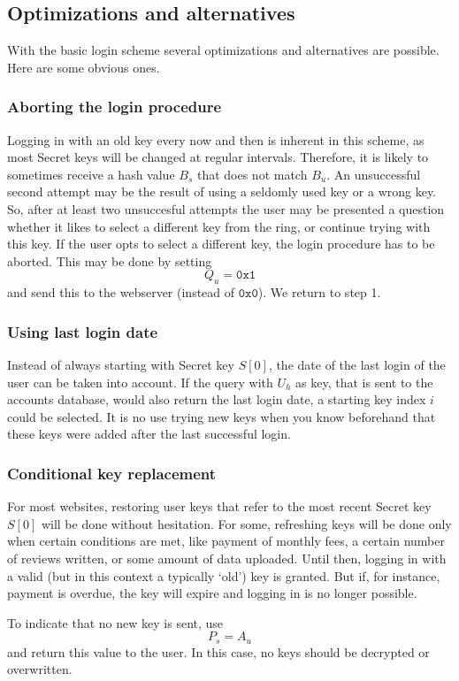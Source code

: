 \subsection{Optimizations and alternatives}
With the basic login scheme several optimizations and alternatives are possible.
Here are some obvious ones.
\subsubsection{Aborting the login procedure}
Logging in with an old key every now and then is inherent in this scheme,
as most Secret keys will be changed at regular intervals.
Therefore,
it is likely to sometimes receive a hash value $B_s$ that does not match $B_u$.
An unsuccessful second attempt may be the result of using a seldomly used key or a wrong key.
So, after at least two unsuccesful attempts
the user may be presented a question whether it likes to select a different key from the ring,
or continue trying with this key.
If the user opts to select a different key, the login procedure has to be aborted.
This may be done by setting
\[Q_u=\mathtt{0x1}\]
and send this to the webserver
(instead of $\mathtt{0x0}$).
We return to step 1.

\subsubsection{Using last login date}
Instead of always starting with Secret key $S[0]$,
the date of the last login of the user can be taken into account.
If the query with $U_h$ as key,
that is sent to the accounts database,
would also return the last login date,
a starting key index $i$ could be selected.
It is no use trying new keys when you know beforehand that these keys were added after the last successful login.

\subsubsection{Conditional key replacement}
For most websites, restoring user keys that refer to the most recent Secret key $S[0]$ will be done without hesitation.
For some,
refreshing keys will be done only when certain conditions are met,
like payment of monthly fees,
a certain number of reviews written,
or some amount of data uploaded.
Until then,
logging in with a valid
(but in this context a typically `old')
key is granted.
But if, for instance, payment is overdue, the key will expire and logging in is no longer possible.
\par
To indicate that no new key is sent,
use
\[P_s = A_u\]
and return this value to the user.
In this case,
no keys should be decrypted or overwritten.

